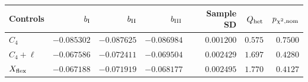 \begin{tabular}{lrrrrrr}
\toprule
Controls & $b_{\rm I}$ & $b_{\rm II}$ & $b_{\rm III}$ & Sample SD & $Q_{\rm het}$ & $p_{\chi^2,\rm nom}$ \\
\midrule
$C_4$ & $-0.085302$ & $-0.087625$ & $-0.086984$ & $0.001200$ & $0.575$ & $0.7500$ \\
$C_4+\ell$ & $-0.067586$ & $-0.072411$ & $-0.069504$ & $0.002429$ & $1.697$ & $0.4280$ \\
$X_{\rm flex}$ & $-0.067188$ & $-0.071919$ & $-0.068177$ & $0.002495$ & $1.770$ & $0.4127$ \\
\bottomrule
\end{tabular}
